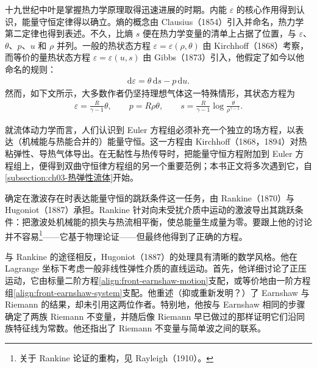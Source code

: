 \documentclass[../../main.tex]{subfiles}
\begin{document}
十九世纪中叶是掌握热力学原理取得迅速进展的时期。内能 $\varepsilon$ 的核心作用得到认识，能量守恒定律得以确立。熵的概念由 Clausius（1854）引入并命名，热力学第二定律也得到表述。不久，比熵 $s$ 便在热力学变量的清单上占据了位置，与 $\varepsilon$、$\theta$、$p$、$u$ 和 $\rho$ 并列。一般的热状态方程 $\varepsilon=\varepsilon(\rho,\theta)$ 由 Kirchhoff（1868）考察，而等价的量热状态方程 $\varepsilon=\varepsilon(u,s)$ 由 Gibbs（1873）引入，他假定了如今以他命名的规则：
\begin{align}
\mathrm{d}\varepsilon=\theta\,\mathrm{d}s-p\,\mathrm{d}u.\label{align:front-gibbs}
\end{align}
然而，如下文所示，大多数作者仍坚持理想气体这一特殊情形，其状态方程为
\begin{align}
\varepsilon=\frac{R}{\gamma-1}\theta,\qquad p=R\rho\theta,\qquad
s=\frac{R}{\gamma-1}\log\frac{\theta}{\rho^{\gamma-1}}.\label{align:front-ideal-gas-state}
\end{align}

就流体动力学而言，人们认识到 Euler 方程组必须补充一个独立的场方程，以表达（机械能与热能合并的）能量守恒。这一方程由 Kirchhoff（1868，1894）对热粘弹性、导热气体导出。在无黏性与热传导时，把能量守恒方程附加到 Euler 方程组上，便得到双曲守恒律方程组的另一个重要范例；本书正文将多次遇到它，自\cref{subsection:ch03-热弹性流体}开始。

确定在激波存在时表达能量守恒的跳跃条件这一任务，由 Rankine（1870）与 Hugoniot（1887）承担。Rankine 针对向未受扰介质中运动的激波导出其跳跃条件：把激波处机械能的损失与热流相平衡，使总能量生成量为零。要跟上他的讨论并不容易\footnote{关于 Rankine 论证的重构，见 Rayleigh（1910）。}——它基于物理论证——但最终他得到了正确的方程。

与 Rankine 的途径相反，Hugoniot（1887）的处理具有清晰的数学风格。他在 Lagrange 坐标下考虑一般非线性弹性介质的直线运动。首先，他详细讨论了正压运动，它由标量二阶方程\eqref{align:front-earnshaw-motion}支配，或等价地由一阶方程组\eqref{align:front-earnshaw-system}支配。他重述（抑或重新发明？）了 Earnshaw 与 Riemann 的结果，却未引用这两位作者。特别地，他按与 Earnshaw 相同的步骤确定了两族 Riemann 不变量，并随后像 Riemann 早已做过的那样证明它们沿同族特征线为常数。他还指出了 Riemann 不变量与简单波之间的联系。
\end{document}
